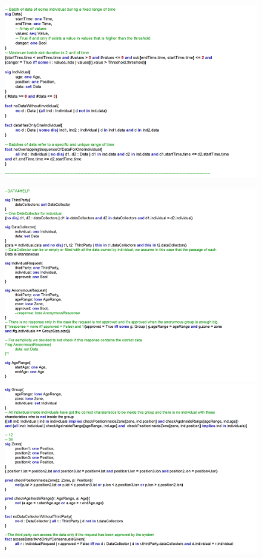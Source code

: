 \documentclass{article}
\begin{document}
\begin{legal}
\begin{figure}[H]
			\includegraphics[width=\linewidth]{../images/alloy/code/data4Help_2.PNG}
		\end{figure}
		\begin{figure}[H]
			\includegraphics[width=\linewidth]{../images/alloy/code/data4Help_3.PNG}
			\includegraphics[width=\linewidth]{../images/alloy/code/data4Help_4.PNG}

\end{figure}
\end{legal}
\end{document}
